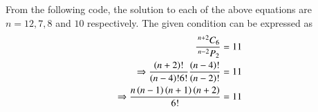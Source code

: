 %
From the following code, the solution to each of the above equations are $n = 12,7, 8$ and $10$ respectively. The given condition can be expressed as
%
\begin{align}
\frac{\,^{n+2}C_{6}}{\,^{n-2}P_{2}} &= 11 \\
\Rightarrow \frac{\left(n+2\right)!}{\left(n-4\right)!6!}\frac{\left(n-4\right)!}{\left(n-2\right)!} &= 11 \\
\Rightarrow \frac{n\left(n-1\right)\left(n+1\right)\left(n+2\right)}{6!} &=11
\end{align}
%
